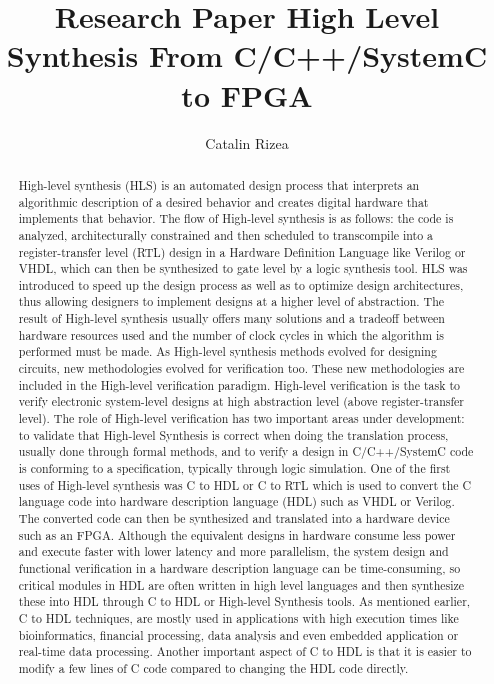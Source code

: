 \documentclass{cup-pan}
\title{
Research Paper High Level Synthesis From C/C++/SystemC to FPGA
}
\author{Catalin Rizea}
\affil{POLITEHNICA University of Bucharest, Faculty of Electronics, Telecommunications and Information Technology.Master degree, Advanced Computing in Embedded Systems Email: \url{catalinrizea96@gmail.com}}
\begin{document}
\maketitle

\begin{abstract}
High-level synthesis (HLS) is an automated design process that interprets an algorithmic description of a desired behavior and creates digital hardware that implements that behavior. The flow of High-level synthesis is as follows: the code is analyzed, architecturally constrained and then scheduled to transcompile into a register-transfer level (RTL) design in a Hardware Definition Language like Verilog or VHDL, which can then be synthesized to gate level by a logic synthesis tool. HLS was introduced to speed up the design process as well as to optimize design architectures, thus allowing designers to implement designs at a higher level of abstraction. 
The result of High-level synthesis usually offers many solutions and a tradeoff between hardware resources used and the number of clock cycles in which the algorithm is performed must be made.
As High-level synthesis methods evolved for designing circuits, new methodologies evolved for verification too. These new methodologies are included in the High-level verification paradigm. High-level verification is the task to verify electronic system-level designs at high abstraction level (above register-transfer level). The role of High-level verification has two important areas under development: to validate that High-level Synthesis is correct when doing the translation process, usually done through formal methods, and to verify a design in C/C++/SystemC code is conforming to a specification, typically through logic simulation.
One of the first uses of High-level synthesis was C to HDL or C to RTL which is used to convert the C language code into hardware description language (HDL) such as VHDL or Verilog. The converted code can then be synthesized and translated into a hardware device such as an FPGA. Although the equivalent designs in hardware consume less power and execute faster with lower latency and more parallelism, the system design and functional verification in a hardware description language can be time-consuming, so critical modules in HDL are often written in high level languages and then synthesize these into HDL through C to HDL or High-level Synthesis tools. As mentioned earlier, C to HDL techniques, are mostly used in applications with high execution times like bioinformatics, financial processing, data analysis and even embedded application or real-time data processing. Another important aspect of C to HDL is that it is easier to modify a few lines of C code compared to changing the HDL code directly.


\end{abstract}
\end{document}
